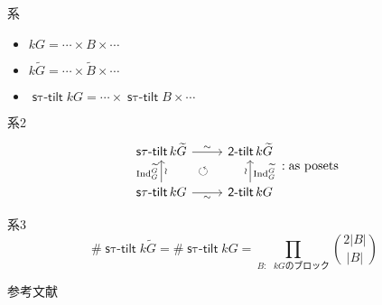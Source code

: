 \documentclass[dvipdfmx,10pt,handout
]{beamer}
\newcommand{\twotilt}{\operatorname{\mathsf{2-tilt}}}
\newcommand{\induc}{{\operatorname{Ind}\nolimits}}
\newcommand{\stautilt}{\operatorname{\mathsf{s\tau-tilt}}}
\begin{document}
\begin{frame}
    {系}
    \begin{itemize}
        \item \(kG=\cdots \times B \times \cdots\)
        \item \(k\widetilde{G}=\cdots \times \widetilde{B} \times \cdots\)
        \item \(\stautilt kG=\cdots \times \stautilt B \times \cdots\)
    \end{itemize}
    \pause
    \begin{block}
        {系2}
        \[
            \begin{tikzcd}[ampersand replacement=\&]
                \stautilt k{\widetilde G}\ar[r,"\sim"]\ar[rd,phantom,"\circlearrowleft"]\&\twotilt k{\widetilde G}\\
                \stautilt kG \ar[r,"\sim"'] \ar[u,"\induc_G^{\widetilde{G}}","\wr "']\&\twotilt k{G}\ar[u,"\wr","\induc_G^{\widetilde{G}}"']
            \end{tikzcd}:\text{as posets}
        \]
    \end{block}
    \pause
    \begin{block}
        {系3}
        \[\#\stautilt k\widetilde{G}=\#\stautilt kG=\prod_{\text{\(B:\) \(kG\)のブロック}}\binom{2|B|}{|B|}\]
    \end{block}
\end{frame}

\begin{frame}[allowframebreaks]{参考文献}
    
    
\end{frame}
\end{document}
